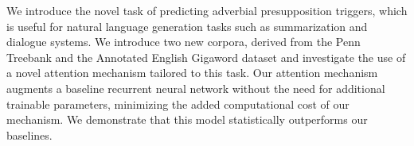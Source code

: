 We introduce the novel task of predicting adverbial presupposition triggers, which is useful for natural language generation tasks such as summarization and dialogue systems. We introduce two new corpora, derived from the Penn Treebank and the Annotated English Gigaword dataset and investigate the use of a novel attention mechanism tailored to this task. Our attention mechanism augments a baseline recurrent neural network without the need for additional trainable parameters, minimizing the added computational cost of our mechanism.  We demonstrate that this model statistically outperforms our baselines.
